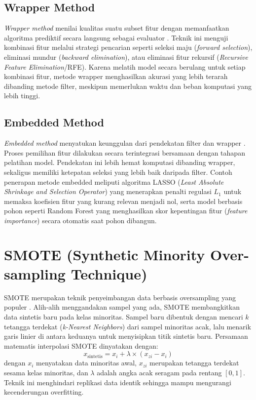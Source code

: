 \documentclass[a4paper,oneside,12pt]{report}
\begin{document}
\subsection{Wrapper Method}
\textit{Wrapper method} menilai kualitas suatu subset fitur dengan memanfaatkan algoritma prediktif secara langsung sebagai evaluator \cite{ref_kohavi}. Teknik ini menguji kombinasi fitur melalui strategi pencarian seperti seleksi maju (\textit{forward selection}), eliminasi mundur (\textit{backward elimination}), atau eliminasi fitur rekursif (\textit{Recursive Feature Elimination}/RFE). Karena melatih model secara berulang untuk setiap kombinasi fitur, metode wrapper menghasilkan akurasi yang lebih terarah dibanding metode filter, meskipun memerlukan waktu dan beban komputasi yang lebih tinggi.

\subsection{Embedded Method}
\textit{Embedded method} menyatukan keunggulan dari pendekatan filter dan wrapper \cite{ref_tibshirani}. Proses pemilihan fitur dilakukan secara terintegrasi bersamaan dengan tahapan pelatihan model. Pendekatan ini lebih hemat komputasi dibanding wrapper, sekaligus memiliki ketepatan seleksi yang lebih baik daripada filter. Contoh penerapan metode embedded meliputi algoritma LASSO (\textit{Least Absolute Shrinkage and Selection Operator}) yang menerapkan penalti regulasi $L_1$ untuk memaksa koefisien fitur yang kurang relevan menjadi nol, serta model berbasis pohon seperti Random Forest yang menghasilkan skor kepentingan fitur (\textit{feature importance}) secara otomatis saat pohon dibangun.

\section{SMOTE (Synthetic Minority Over-sampling Technique)}
SMOTE merupakan teknik penyeimbangan data berbasis oversampling yang populer \cite{ref_wijayanti}. Alih-alih menggandakan sampel yang ada, SMOTE membangkitkan data sintetis baru pada kelas minoritas. Sampel baru dibentuk dengan mencari $k$ tetangga terdekat (\textit{k-Nearest Neighbors}) dari sampel minoritas acak, lalu menarik garis linier di antara keduanya untuk menyisipkan titik sintetis baru. Persamaan matematis interpolasi SMOTE dinyatakan dengan:
\begin{equation}
    x_{\text{sintetis}} = x_i + \lambda \times (x_{zi} - x_i)
\end{equation}
dengan $x_i$ menyatakan data minoritas awal, $x_{zi}$ merupakan tetangga terdekat sesama kelas minoritas, dan $\lambda$ adalah angka acak seragam pada rentang $[0, 1]$. Teknik ini menghindari replikasi data identik sehingga mampu mengurangi kecenderungan overfitting.
\end{document}
